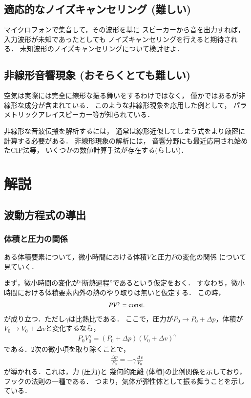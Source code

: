 \subsection{適応的なノイズキャンセリング (難しい)}

マイクロフォンで集音して，その波形を基に
スピーカーから音を出力すれば，
入力波形が未知であったとしても
ノイズキャンセリングを行えると期待される．
未知波形のノイズキャンセリングについて検討せよ．


\subsection{非線形音響現象 (おそらくとても難しい)}

空気は実際には完全に線形な振る舞いをするわけではなく，
僅かではあるが非線形な成分が含まれている．
このような非線形現象を応用した例として，
パラメトリックアレイスピーカー等が知られている．

非線形な音波伝搬を解析するには，
通常は線形近似してしまう式をより厳密に計算する必要がある．
非線形現象の解析には，
音響分野にも最近応用され始めたCIP法等，
いくつかの数値計算手法が存在する(らしい)．


\section{解説}


\subsection{波動方程式の導出}

\subsubsection{体積と圧力の関係}

ある体積要素について，微小時間における体積$V$と圧力$P$の変化の関係
について見ていく．

まず，微小時間の変化が``断熱過程''であるという仮定をおく．
すなわち，微小時間における体積要素内外の熱のやり取りは無いと仮定する．
この時，
\begin{align}
PV^{\gamma}={\rm const.}
\end{align}
が成り立つ．ただし$\gamma$は比熱比である．
ここで，圧力が$P_0\rightarrow P_0+\Delta p$，体積が$V_0\rightarrow V_0+\Delta v$と変化するなら，
\begin{align}
P_0V_0^\gamma=(P_0+\Delta p)(V_0+\Delta v)^\gamma
\end{align}
である．2次の微小項を取り除くことで，
\begin{align}
\frac{\Delta p}{P_0}=-\gamma \frac{\Delta v}{V_0}
\end{align}
が導かれる．これは，力 (圧力)と 幾何的距離 (体積)の比例関係を示しており，
フックの法則の一種である．
つまり，気体が弾性体として振る舞うことを示している．


